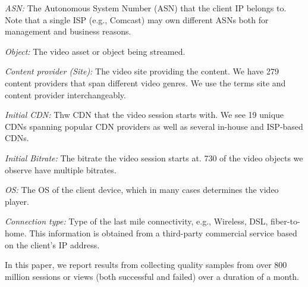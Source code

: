 \begin{packedenumerate}
\item \emph{ASN:} The Autonomous System Number (ASN) that the client
  IP belongs to. Note that a single ISP (e.g., Comcast) may own
  different ASNs both for management and business reasons.

\item \emph{Object:} The video asset or object being streamed.

\item \emph{Content provider (Site):} The video site providing the
  content. We have 279 content providers that span different video
  genres.  We use the terms site and content provider interchangeably.

\item \emph{Initial CDN:} Thw CDN that the video session starts with.
  We see 19 unique CDNs spanning popular CDN providers as well as
  several in-house and ISP-based CDNs. 

\item \emph{Initial Bitrate:} The bitrate the video session
  starts at. 730 of the video objects we
  observe have multiple bitrates.

\item \emph{OS:} The OS of the client device, which in many cases
  determines the video player. 

\item \emph{Connection type:} Type of the last mile connectivity,
  e.g., Wireless, DSL, fiber-to-home. This information is obtained
  from a third-party commercial service based on the client's IP
  address.
\end{packedenumerate}


  In this paper, we report results from collecting quality samples
  from over 800 million sessions or views (both successful and
  failed) over a duration of a month.

